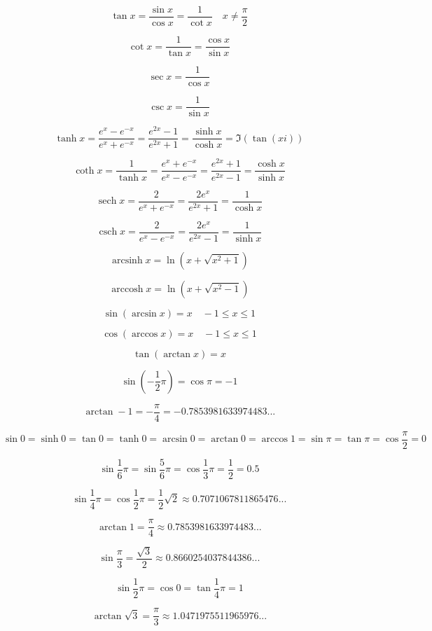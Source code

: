 \documentclass{article}
\DeclareMathOperator{\csch}{csch}
\DeclareMathOperator{\sech}{sech}
\DeclareMathOperator{\arcsinh}{arcsinh}
\DeclareMathOperator{\arccosh}{arccosh}
\begin{document}
$$\tan x = \frac{\sin x}{\cos x} = \frac{1}{\cot x}
\quad x \neq\frac{\pi}{2}$$

$$\cot x = \frac{1}{\tan x} = \frac{\cos x}{\sin x}$$

$$\sec x = \frac{1}{\cos x}$$

$$\csc x = \frac{1}{\sin x}$$

$$\tanh x = \frac{e^x-e^{-x}}{e^x+e^{-x}} =
\frac{e^{2x}-1}{e^{2x}+1} = \frac{\sinh x}{\cosh x} =
\Im(\tan(xi))$$

$$\coth x = \frac{1}{\tanh x} = \frac{e^x + e^{-x}}{e^x - e^{-x}} =
\frac{e^{2x} + 1}{e^{2x} - 1} = \frac{\cosh x}{\sinh x}$$

$$\sech x = \frac{2}{e^x + e^{-x}} = \frac{2e^x}{e^{2x}+1} = \frac{1}{\cosh x}$$

$$\csch x = \frac{2}{e^x - e^{-x}} = \frac{2e^x}{e^{2x}-1} = \frac{1}{\sinh x}$$

$$\arcsinh x = \ln(x+\sqrt{x^2+1})$$

$$\arccosh x = \ln(x+\sqrt{x^2-1})$$

$$\sin(\arcsin x) = x \quad -1 \leq x \leq 1$$

$$\cos(\arccos x) = x \quad -1 \leq x \leq 1$$

$$\tan(\arctan x) = x$$

$$\sin(-\frac{1}{2}\pi) = \cos\pi = -1$$

$$\arctan-1 = -\frac{\pi}{4} = -0.7853981633974483...$$

$$\sin0 = \sinh0 = \tan0 = \tanh0 = \arcsin0 = \arctan0 = \arccos1 = \sin\pi =
\tan\pi = \cos\frac{\pi}{2} = 0$$

$$\sin\frac{1}{6}\pi = \sin\frac{5}{6}\pi = \cos\frac{1}{3}\pi = \frac{1}{2} = 0.5$$

$$\sin\frac{1}{4}\pi = \cos\frac{1}{2}\pi = \frac{1}{2}\sqrt{2}\approx0.7071067811865476...$$

$$\arctan1=\frac{\pi}{4}\approx0.7853981633974483...$$

$$\sin\frac{\pi}{3}=\frac{\sqrt{3}}{2}\approx0.8660254037844386...$$

$$\sin\frac{1}{2}\pi = \cos0 = \tan\frac{1}{4}\pi = 1$$

$$\arctan\sqrt{3} = \frac{\pi}{3}\approx1.0471975511965976...$$
\end{document}
